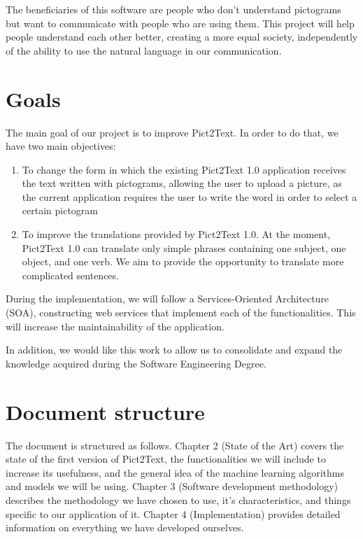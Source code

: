 The beneficiaries of this software are people who don't understand pictograms but want to communicate with people who are using them. This project will help people understand each other better, creating a more equal society, independently of the ability to use the natural language in our communication. 

\section{Goals}
The main goal of our project is to improve Pict2Text. In order to do that, we have two main objectives:
\begin{enumerate}
\item To change the form in which the existing Pict2Text 1.0 application receives the text written with pictograms, allowing the user to upload a picture, as the current application requires the user to write the word in order to select a certain pictogram
\item To improve the translations provided by Pict2Text 1.0. At the moment, Pict2Text 1.0 can translate only simple phrases containing one subject, one object, and one verb. We aim to provide the opportunity to translate more complicated sentences.
\end{enumerate}

During the implementation, we will follow a Services-Oriented Architecture (SOA), constructing web services that implement each of the functionalities. This will increase the maintainability of the application.

In addition, we would like this work to allow us to consolidate and expand the knowledge acquired during the Software Engineering Degree.

\section{Document structure}
The document is structured as follows.
Chapter 2 (State of the Art) covers the state of the first version of Pict2Text, the functionalities we will include to increase its usefulness, and the general idea of the machine learning algorithms and models we will be using.
Chapter 3 (Software development methodology) describes the methodology we have chosen to use, it's characteristics, and things specific to our application of it. 
Chapter 4 (Implementation) provides detailed information on everything we have developed ourselves.








